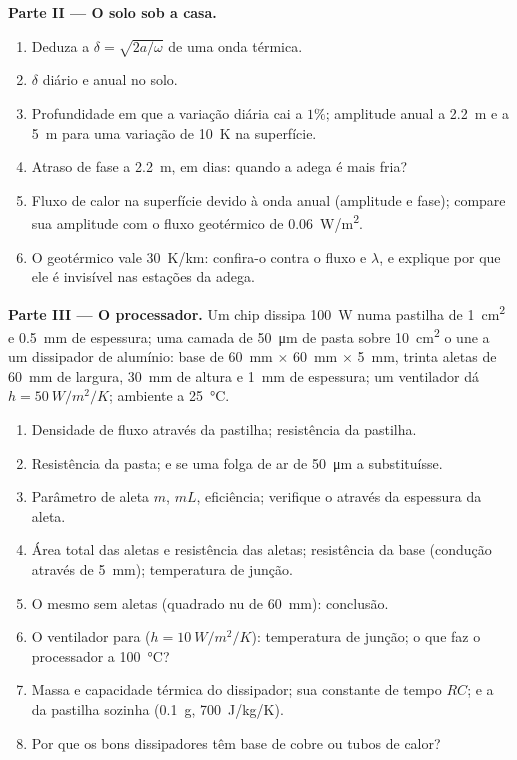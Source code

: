 \begin{problem}
\textbf{Parte II --- O solo sob a casa.}
\begin{enumerate}[resume]
  \item Deduza a  $\delta = \sqrt{2a/\omega}$ de uma
        onda térmica.
  \item $\delta$ diário e anual no solo.
  \item Profundidade em que a variação diária cai a $1\%$; amplitude anual
        a \qty{2.2}{m} e a \qty{5}{m} para uma variação de \qty{10}{K}
        na superfície.
  \item Atraso de fase a \qty{2.2}{m}, em dias: quando a adega é mais fria?
  \item Fluxo de calor na superfície devido à onda anual (amplitude e fase);
        compare sua amplitude com o fluxo geotérmico de \qty{0.06}{W/m^2}.
  \item O  geotérmico vale \qty{30}{K/km}: confira-o contra o
        fluxo e $\lambda$, e explique por que ele é invisível nas
        estações da adega.
\end{enumerate}

\textbf{Parte III --- O processador.}
Um chip dissipa \qty{100}{W} numa pastilha de \qty{1}{cm^2} e \qty{0.5}{mm}
de espessura; uma camada de \qty{50}{\micro m} de pasta sobre \qty{10}{cm^2} o une
a um dissipador de alumínio: base de \qty{60}{mm} $\times$ \qty{60}{mm} $\times$
\qty{5}{mm}, trinta aletas de \qty{60}{mm} de largura, \qty{30}{mm} de altura e \qty{1}{mm}
de espessura; um ventilador dá $h = \qty{50}{W/m^2/K}$; ambiente a \qty{25}{\celsius}.
\begin{enumerate}[resume]
  \item Densidade de fluxo através da pastilha; resistência da pastilha.
  \item Resistência da pasta; e se uma folga de ar de \qty{50}{\micro m}
        a substituísse.
  \item Parâmetro de aleta $m$, $mL$, eficiência; verifique o 
        através da espessura da aleta.
  \item Área total das aletas e resistência das aletas; resistência da
        base (condução através de \qty{5}{mm}); temperatura de junção.
  \item O mesmo sem aletas (quadrado nu de \qty{60}{mm}): conclusão.
  \item O ventilador para ($h = \qty{10}{W/m^2/K}$): temperatura de junção;
        o que faz o processador a \qty{100}{\celsius}?
  \item Massa e capacidade térmica do dissipador; sua constante de tempo $RC$;
        e a da pastilha sozinha (\qty{0.1}{g}, \qty{700}{J/kg/K}).
  \item Por que os bons dissipadores têm base de cobre ou tubos de calor?
\end{enumerate}


\end{problem}
